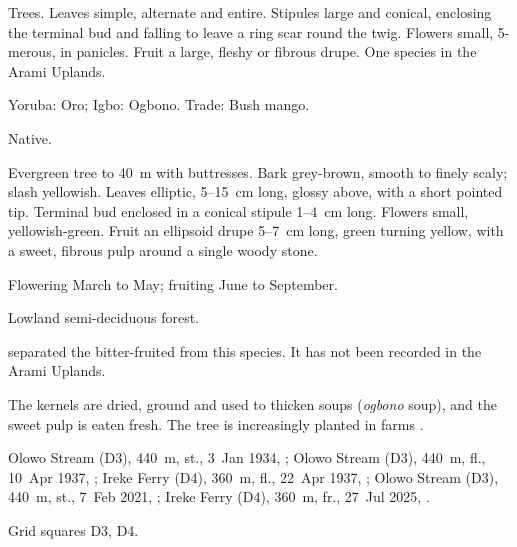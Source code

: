 \label{fam:irvingiaceae}

Trees. Leaves simple, alternate and entire. Stipules large and
conical, enclosing the terminal bud and falling to leave a ring scar
round the twig. Flowers small, 5-merous, in panicles. Fruit a large,
fleshy or fibrous drupe. One species in the Arami Uplands.

\label{sp:IRV01}

 

 Yoruba: Oro; Igbo: Ogbono. Trade: Bush
mango.

 Native.

 Evergreen tree to 40~m with buttresses. Bark
grey-brown, smooth to finely scaly; slash yellowish. Leaves elliptic,
5--15~cm long, glossy above, with a short pointed tip. Terminal bud
enclosed in a conical stipule 1--4~cm long. Flowers small,
yellowish-green. Fruit an ellipsoid drupe 5--7~cm long, green turning
yellow, with a sweet, fibrous pulp around a single woody stone.

 Flowering March to May; fruiting June to September.

 Lowland semi-deciduous forest.

 \citet{harris1996} separated the bitter-fruited
 from this species. It has not
been recorded in the Arami Uplands.

 The kernels are dried, ground and used to thicken soups
(\textit{ogbono} soup), and the sweet pulp is eaten fresh. The tree is
increasingly planted in farms \citep{orwa2009}.

 Olowo Stream (D3), 440~m, st., 3~Jan 1934, ;
Olowo Stream (D3), 440~m, fl., 10~Apr 1937, ;
Ireke Ferry (D4), 360~m, fl., 22~Apr 1937, ;
Olowo Stream (D3), 440~m, st., 7~Feb 2021, ;
Ireke Ferry (D4), 360~m, fr., 27~Jul 2025, .

 Grid squares D3, D4.

\begin{center}
\end{center}